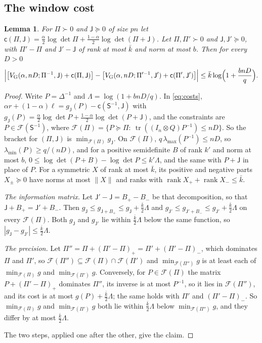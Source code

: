 \documentclass[11pt,onecolumn]{IEEEtran}
\newtheorem{lemma}[theorem]{Lemma}
\newcommand{\tr}{\operatorname{tr}}
\newcommand{\VG}{V_{\mathrm G}}
\begin{document}
\subsection{The window cost}

\begin{lemma}\label{lem:perturb}
For $\Pi\succ0$ and $\mathsf J\succeq0$ of size $pn$ let
$\mathsf c(\Pi,\mathsf J)=\tfrac\alpha2\log\det\Pi+\tfrac{1-\alpha}2\log\det(\Pi+\mathsf J)$.
Let $\Pi,\Pi'\succ0$ and $\mathsf J,\mathsf J'\succeq0$, with $\Pi'-\Pi$ and
$\mathsf J'-\mathsf J$ of rank at most $\bar k$ and norm at most $b$.
Then for every $D>0$
\[
\Bigl|\bigl[\VG(\alpha,nD;\Pi^{-1},\mathsf J)+\mathsf c(\Pi,\mathsf J)\bigr]-\bigl[\VG(\alpha,nD;\Pi'^{-1},\mathsf J')+\mathsf c(\Pi',\mathsf J')\bigr]\Bigr|
\le\bar k\log\Bigl(1+\frac{bnD}q\Bigr).
\]
\end{lemma}

\begin{proof}
Write $P=\Delta^{-1}$ and $\Lambda=\log(1+bnD/q)$. In \eqref{eq:costs},
$\alpha r+(1-\alpha)\ell=g_{\mathsf J}(P)-\mathsf c(\mathsf S^{-1},\mathsf J)$
with
$g_{\mathsf J}(P)=\tfrac\alpha2\log\det P+\tfrac{1-\alpha}2\log\det(P+\mathsf J)$,
and the constraints are $P\in\mathcal F(\mathsf S^{-1})$, where
$\mathcal F(\Pi)=\{P\succeq\Pi:\ \tr((I_n\otimes Q)P^{-1})\le nD\}$. So the
bracket for $(\Pi,\mathsf J)$ is $\min_{\mathcal F(\Pi)}g_{\mathsf J}$. On
$\mathcal F(\Pi)$, $q\,\lambda_{\max}(P^{-1})\le nD$, so
$\lambda_{\min}(P)\ge q/(nD)$, and for a positive semidefinite $B$ of
rank $k'$ and norm at most $b$,
$0\le\log\det(P+B)-\log\det P\le k'\Lambda$, and the same with
$P+\mathsf J$ in place of $P$. For a symmetric $X$ of rank at most
$\bar k$, its positive and negative parts $X_\pm\succeq0$ have norms at
most $\|X\|$ and ranks with $\operatorname{rank}X_++\operatorname{rank}X_-\le\bar k$.

\emph{The information matrix.} Let $\mathsf J'-\mathsf J=B_+-B_-$ be that
decomposition, so that $\mathsf J+B_+=\mathsf J'+B_-$. Then
$g_{\mathsf J}\le g_{\mathsf J+B_+}\le g_{\mathsf J}+\tfrac{\bar k}2\Lambda$ and
$g_{\mathsf J'}\le g_{\mathsf J'+B_-}\le g_{\mathsf J'}+\tfrac{\bar k}2\Lambda$
on every $\mathcal F(\Pi)$. Both $g_{\mathsf J}$ and $g_{\mathsf J'}$ lie
within $\tfrac{\bar k}2\Lambda$ below the same function, so
$|g_{\mathsf J}-g_{\mathsf J'}|\le\tfrac{\bar k}2\Lambda$.

\emph{The precision.} Let $\Pi''=\Pi+(\Pi'-\Pi)_+=\Pi'+(\Pi'-\Pi)_-$,
which dominates $\Pi$ and $\Pi'$, so
$\mathcal F(\Pi'')\subseteq\mathcal F(\Pi)\cap\mathcal F(\Pi')$ and
$\min_{\mathcal F(\Pi'')}g$ is at least each of $\min_{\mathcal F(\Pi)}g$
and $\min_{\mathcal F(\Pi')}g$. Conversely, for $P\in\mathcal F(\Pi)$ the
matrix $P+(\Pi'-\Pi)_+$ dominates $\Pi''$, its inverse is at most
$P^{-1}$, so it lies in $\mathcal F(\Pi'')$, and its cost is at most
$g(P)+\tfrac{\bar k}2\Lambda$; the same holds with $\Pi'$ and
$(\Pi'-\Pi)_-$. So $\min_{\mathcal F(\Pi)}g$ and $\min_{\mathcal F(\Pi')}g$
both lie within $\tfrac{\bar k}2\Lambda$ below $\min_{\mathcal F(\Pi'')}g$,
and they differ by at most $\tfrac{\bar k}2\Lambda$.

The two steps, applied one after the other, give the claim.
\end{proof}
\end{document}
